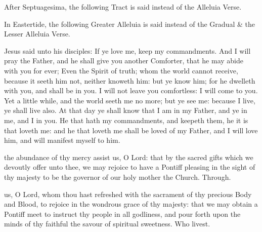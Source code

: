 \begin{rubric}
    After Septuagesima, the following Tract is said instead of the Alleluia Verse.
\end{rubric}


\begin{rubric}
    In Eastertide, the following Greater Alleluia is said instead of the Gradual \& the Lesser Alleluia Verse.
\end{rubric}


 Jesus said unto his disciples:  If ye love me, keep my commandments. And I will pray the Father, and he shall give you another Comforter, that he may abide with you for ever; Even the Spirit of truth; whom the world cannot receive, because it seeth him not, neither knoweth him: but ye know him; for he dwelleth with you, and shall be in you. I will not leave you comfortless: I will come to you. Yet a little while, and the world seeth me no more; but ye see me: because I live, ye shall live also. At that day ye shall know that I am in my Father, and ye in me, and I in you. He that hath my commandments, and keepeth them, he it is that loveth me: and he that loveth me shall be loved of my Father, and I will love him, and will manifest myself to him.


\secret
{} the abundance of thy mercy assist us, O Lord: that by the sacred gifts which we devoutly offer unto thee, we may rejoice to have a Pontiff pleasing in the sight of thy majesty to be the governor of our holy mother the Church. Through.


\postcommunion
{} us, O Lord, whom thou hast refreshed with the sacrament of thy precious Body and Blood, to rejoice in the wondrous grace of thy majesty: that we may obtain a Pontiff meet to instruct thy people in all godliness, and pour forth upon the minds of thy faithful the savour of spiritual sweetness. Who livest.


